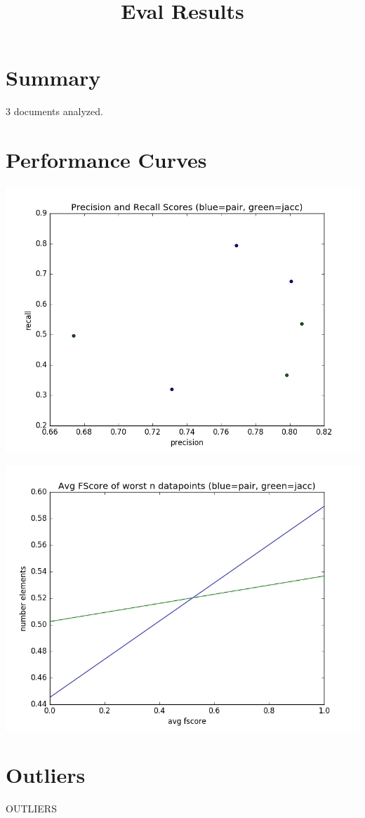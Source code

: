 \documentclass{article}
\title{Eval Results}
\begin{document}
\maketitle

\setcounter{section}{-1}
\section{Summary}
3 documents analyzed.
\section{Performance Curves}
\includegraphics[width=15cm]{TEST.png}

    \includegraphics[width=15cm]{TEST2.png}
\section{Outliers}
OUTLIERS
\end{document}
